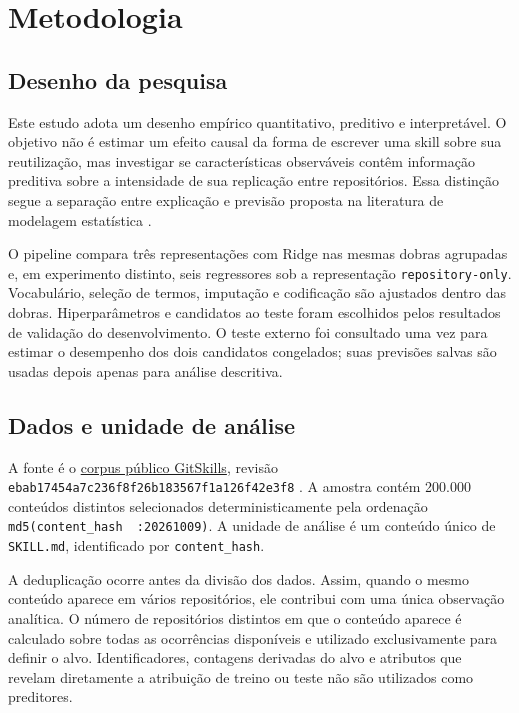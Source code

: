 \section{Metodologia}\label{metodologia}

\subsection{Desenho da pesquisa}\label{desenho-da-pesquisa}

Este estudo adota um desenho empírico quantitativo, preditivo e
interpretável. O objetivo não é estimar um efeito causal da forma de
escrever uma skill sobre sua reutilização, mas investigar se
características observáveis contêm informação preditiva sobre a
intensidade de sua replicação entre repositórios. Essa distinção segue a
separação entre explicação e previsão proposta na literatura de
modelagem estatística \cite{shmueli2010explain}.

O pipeline compara três representações com Ridge nas mesmas dobras
agrupadas e, em experimento distinto, seis regressores sob a
representação \texttt{repository-only}. Vocabulário, seleção de termos,
imputação e codificação são ajustados dentro das dobras. Hiperparâmetros
e candidatos ao teste foram escolhidos pelos resultados de validação do
desenvolvimento. O teste externo foi consultado uma vez para estimar o
desempenho dos dois candidatos congelados; suas previsões salvas são
usadas depois apenas para análise descritiva.

\subsection{Dados e unidade de
análise}\label{dados-e-unidade-de-anuxe1lise}

A fonte é o
\href{https://huggingface.co/datasets/mvaccargiu/gitskills}{corpus
público GitSkills}, revisão
\texttt{ebab17454a7c236f8f26b183567f1a126f42e3f8} \cite{gitskills2027}.
A amostra contém 200.000 conteúdos distintos selecionados
deterministicamente pela ordenação
\texttt{md5(content\_hash\ \textbar{}\textbar{}\ \textquotesingle{}:20261009\textquotesingle{})}.
A unidade de análise é um conteúdo único de \texttt{SKILL.md},
identificado por \texttt{content\_hash}.

A deduplicação ocorre antes da divisão dos dados. Assim, quando o mesmo
conteúdo aparece em vários repositórios, ele contribui com uma única
observação analítica. O número de repositórios distintos em que o
conteúdo aparece é calculado sobre todas as ocorrências disponíveis e
utilizado exclusivamente para definir o alvo. Identificadores, contagens
derivadas do alvo e atributos que revelam diretamente a atribuição de
treino ou teste não são utilizados como preditores.

